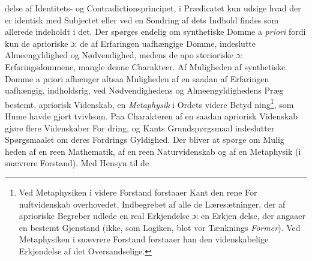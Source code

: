 \documentclass[12pt,a4paper]{book}
\begin{document}
delse af Identitets- og Contradictionsprincipet, i Prædicatet
kun udsige hvad der er identisk med Subjectet eller ved en
Sondring af dets Indhold findes som allerede indeholdt i det.
Der spørges endelig om synthetiske Domme a \emph{priori} fordi
kun de aprioriske ɔ: de af Erfaringen uafhængige Domme,
indeslutte Almeengyldighed og Nødvendighed, medens de apo\-%
sterioriske ɔ: Erfaringsdommene, mangle denne Charakteer.
Af Muligheden af synthetiske Domme a priori afhænger altsaa
Muligheden af en saadan af Erfaringen uafhængig, indholdsrig,
ved Nødvendighedens og Almeengyldighedens Præg bestemt,
apriorisk Videnskab, en \emph{Metaphysik} i Ordets videre Betyd\-%
ning\footnote{Ved Metaphysiken i videre Forstand forstaaer Kant den rene For\-%
nuftvidenskab overhovedet, Indbegrebet af alle de Læresætninger,
der af aprioriske Begreber udlede en real Erkjendelse ɔ: en Erkjen\-%
delse, der angaaer en bestemt Gjenstand (ikke, som Logiken, blot
vor Tænknings \emph{Former}). Ved Metaphysiken i snævrere Forstand
forstaaer han den videnskabelige Erkjendelse af det Oversandselige.}, som Hume havde gjort tvivlsom. Paa Charakteren af
en saadan apriorisk Videnskab gjøre flere Videnskaber For\-%
dring, og Kants Grundspørgsmaal indeslutter Spørgsmaalet om
deres Fordrings Gyldighed. Der bliver at spørge om Mulig\-%
heden af en reen Mathematik, af en reen Naturvidenskab og
af en Metaphysik (i snævrere Forstand). Med Hensyn til de
\end{document}
